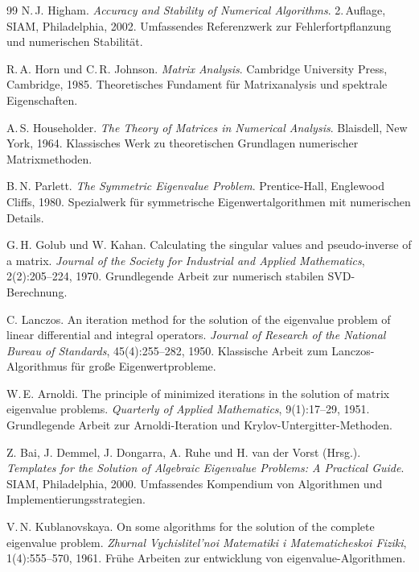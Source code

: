 \documentclass[a4paper,12pt]{article}
\theoremstyle{definition}
\begin{document}
\begin{thebibliography}{99}
N.\,J. Higham. \textit{Accuracy and Stability of Numerical Algorithms}. 2.\,Auflage, SIAM, Philadelphia, 2002.
\newblock Umfassendes Referenzwerk zur Fehlerfortpflanzung und numerischen Stabilität.

R.\,A. Horn und C.\,R. Johnson. \textit{Matrix Analysis}. Cambridge University Press, Cambridge, 1985.
\newblock Theoretisches Fundament für Matrixanalysis und spektrale Eigenschaften.

A.\,S. Householder. \textit{The Theory of Matrices in Numerical Analysis}. Blaisdell, New York, 1964.
\newblock Klassisches Werk zu theoretischen Grundlagen numerischer Matrixmethoden.

B.\,N. Parlett. \textit{The Symmetric Eigenvalue Problem}. Prentice-Hall, Englewood Cliffs, 1980.
\newblock Spezialwerk für symmetrische Eigenwertalgorithmen mit numerischen Details.

G.\,H. Golub und W. Kahan. Calculating the singular values and pseudo-inverse of a matrix. \textit{Journal of the Society for Industrial and Applied Mathematics}, 2(2):205--224, 1970.
\newblock Grundlegende Arbeit zur numerisch stabilen SVD-Berechnung.

C. Lanczos. An iteration method for the solution of the eigenvalue problem of linear differential and integral operators. \textit{Journal of Research of the National Bureau of Standards}, 45(4):255--282, 1950.
\newblock Klassische Arbeit zum Lanczos-Algorithmus für große Eigenwertprobleme.

W.\,E. Arnoldi. The principle of minimized iterations in the solution of matrix eigenvalue problems. \textit{Quarterly of Applied Mathematics}, 9(1):17--29, 1951.
\newblock Grundlegende Arbeit zur Arnoldi-Iteration und Krylov-Untergitter-Methoden.

Z. Bai, J. Demmel, J. Dongarra, A. Ruhe und H. van der Vorst (Hrsg.). \textit{Templates for the Solution of Algebraic Eigenvalue Problems: A Practical Guide}. SIAM, Philadelphia, 2000.
\newblock Umfassendes Kompendium von Algorithmen und Implementierungsstrategien.

V.\,N. Kublanovskaya. On some algorithms for the solution of the complete eigenvalue problem. \textit{Zhurnal Vychislitel'noi Matematiki i Matematicheskoi Fiziki}, 1(4):555--570, 1961.
\newblock Frühe Arbeiten zur entwicklung von eigenvalue-Algorithmen.


\end{thebibliography}
\end{document}
